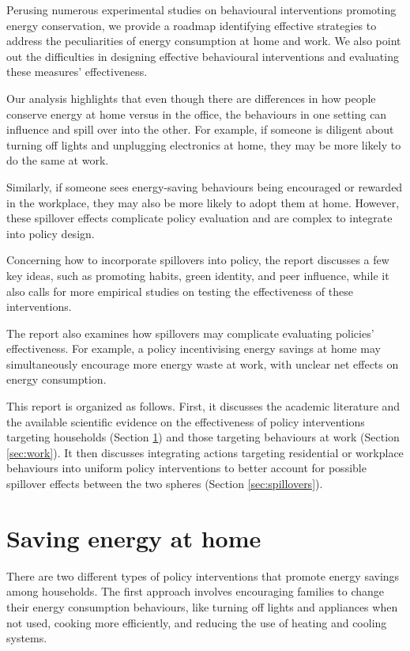\documentclass[
  11pt,
  captions=heading]{scrreport}
\begin{document}
Perusing numerous experimental studies on behavioural interventions
promoting energy conservation, we provide a roadmap identifying
effective strategies to address the peculiarities of energy consumption
at home and work. We also point out the difficulties in designing
effective behavioural interventions and evaluating these measures'
effectiveness.

Our analysis highlights that even though there are differences in how
people conserve energy at home versus in the office, the behaviours in
one setting can influence and spill over into the other. For example, if
someone is diligent about turning off lights and unplugging electronics
at home, they may be more likely to do the same at work.

Similarly, if someone sees energy-saving behaviours being encouraged or
rewarded in the workplace, they may also be more likely to adopt them at
home. However, these spillover effects complicate policy evaluation and
are complex to integrate into policy design.

Concerning how to incorporate spillovers into policy, the report
discusses a few key ideas, such as promoting habits, green identity, and
peer influence, while it also calls for more empirical studies on
testing the effectiveness of these interventions.

The report also examines how spillovers may complicate evaluating
policies' effectiveness. For example, a policy incentivising energy
savings at home may simultaneously encourage more energy waste at work,
with unclear net effects on energy consumption.

This report is organized as follows. First, it discusses the academic
literature and the available scientific evidence on the effectiveness of
policy interventions targeting households (Section \ref{sec:home}) and
those targeting behaviours at work (Section \ref{sec:work}). It then
discusses integrating actions targeting residential or workplace
behaviours into uniform policy interventions to better account for
possible spillover effects between the two spheres (Section
\ref{sec:spillovers}).

\hypertarget{sec:home}{%
\chapter{Saving energy at home}\label{sec:home}}

There are two different types of policy interventions that promote
energy savings among households. The first approach involves encouraging
families to change their energy consumption behaviours, like turning off
lights and appliances when not used, cooking more efficiently, and
reducing the use of heating and cooling systems.
\end{document}
